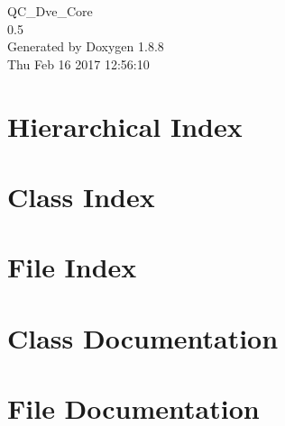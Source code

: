 \documentclass[twoside]{book}
\newcommand{\+}{\discretionary{\mbox{\scriptsize$\hookleftarrow$}}{}{}}
\newcommand{\clearemptydoublepage}{%
  \newpage{\pagestyle{empty}\cleardoublepage}%
}
\begin{document}
\hypersetup{pageanchor=false,
             bookmarks=true,
             bookmarksnumbered=true,
             pdfencoding=unicode
            }
\begin{titlepage}
\vspace*{7cm}
\begin{center}%
{\Large Q\+C\+\_\+\+Dve\+\_\+\+Core \\[1ex]\large 0.\+5 }\\
\vspace*{1cm}
{\large Generated by Doxygen 1.8.8}\\
\vspace*{0.5cm}
{\small Thu Feb 16 2017 12:56:10}\\
\end{center}
\end{titlepage}
\clearemptydoublepage
\tableofcontents
\clearemptydoublepage
{}
\hypersetup{pageanchor=true}

\chapter{Hierarchical Index}

\chapter{Class Index}

\chapter{File Index}

\chapter{Class Documentation}






























\chapter{File Documentation}


\newpage
{}
{}
\printindex
\end{document}
